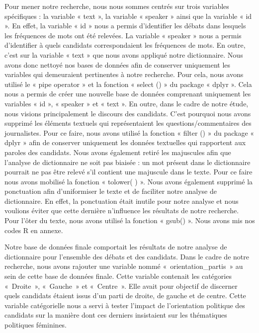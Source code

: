 \documentclass[
  letterpaper,
  DIV=11,
  numbers=noendperiod]{scrartcl}
\begin{document}
Pour mener notre recherche, nous nous sommes centrés sur trois variables
spécifiques : la variable « text », la variable « speaker » ainsi que la
variable « id ». En effet, la variable « id » nous a permis d'identifier
les débats dans lesquels les fréquences de mots ont été relevées. La
variable « speaker » nous a permis d'identifier à quels candidats
correspondaient les fréquences de mots. En outre, c'est sur la variable
« text » que nous avons appliqué notre dictionnaire. Nous avons donc
nettoyé nos bases de données afin de conserver uniquement les variables
qui demeuraient pertinentes à notre recherche. Pour cela, nous avons
utilisé le « pipe operator » et la fonction « select () » du package «
dplyr ». Cela nous a permis de créer une nouvelle base de données
comprenant uniquement les variables « id », « speaker » et « text ». En
outre, dans le cadre de notre étude, nous visions principalement le
discours des candidats. C'est pourquoi nous avons supprimé les éléments
textuels qui représentaient les questions/commentaires des journalistes.
Pour ce faire, nous avons utilisé la fonction « filter () » du package «
dplyr » afin de conserver uniquement les données textuelles qui
rapportent aux paroles des candidats. Nous avons également retiré les
majuscules afin que l'analyse de dictionnaire ne soit pas biaisée : un
mot présent dans le dictionnaire pourrait ne pas être relevé s'il
contient une majuscule dans le texte. Pour ce faire nous avons mobilisé
la fonction « tolower( ) ». Nous avons également supprimé la ponctuation
afin d'uniformiser le texte et de faciliter notre analyse de
dictionnaire. En effet, la ponctuation était inutile pour notre analyse
et nous voulions éviter que cette dernière n'influence les résultats de
notre recherche. Pour l'ôter du texte, nous avons utilisé la fonction «
gsub() ». Nous avons mis nos codes R en annexe.

Notre base de données finale comportait les résultats de notre analyse
de dictionnaire pour l'ensemble des débats et des candidats. Dans le
cadre de notre recherche, nous avons rajouter une variable nommé
«~orientation\_partis~» au sein de cette base de données finale. Cette
variable contenait les catégories «~Droite~», «~Gauche~» et «~Centre~».
Elle avait pour objectif de discerner quels candidats étaient issus d'un
parti de droite, de gauche et de centre. Cette variable catégorielle
nous a servi à tester l'impact de l'orientation politique des candidats
sur la manière dont ces derniers insistaient sur les thématiques
politiques féminines.
\end{document}
